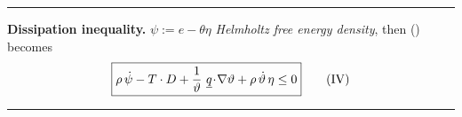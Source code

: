 \rule{0.31\textwidth}{0.2pt}
\smallskip

\textbf{Dissipation inequality.} $\psi:=e-\theta\eta$ \emph{Helmholtz free energy density}, then () becomes
\begin{equation*}
\boxed{
\rho\,\dot{\psi}-T\cdot D+ \frac{1}{\vartheta}\ \underline{q}\!\cdot\!\nabla\vartheta+\rho\,\dot{\vartheta}\,\eta \leq 0
} \tag{\RNum{4}} 
\end{equation*}

\rule{0.31\textwidth}{1pt}













